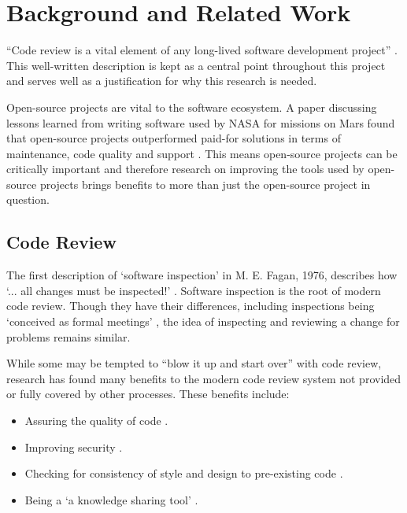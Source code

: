 \chapter{Background and Related Work}
\label{chap:background-and-related-work}

``Code review is a vital element of any long-lived software development project'' \citep[p. 1037]{10.1145/2884781.2884840}. This well-written description is kept as a central point throughout this project and serves well as a justification for why this research is needed.

Open-source projects are vital to the software ecosystem. A paper discussing lessons learned from writing software used by NASA for missions on Mars found that open-source projects outperformed paid-for solutions in terms of maintenance, code quality and support \citep[p. 44]{NorrisMissionCritical}. This means open-source projects can be critically important and therefore research on improving the tools used by open-source projects brings benefits to more than just the open-source project in question.


\section{Code Review}

The first description of `software inspection' in M. E. Fagan, 1976, describes how `... all changes must be inspected!' \citep[p. 280]{5387093}. Software inspection is the root of modern code review. Though they have their differences, including inspections being `conceived as formal meetings' \citep[p. 27]{7202946}, the idea of inspecting and reviewing a change for problems remains similar.

While some may be tempted to ``blow it up and start over'' with code review, research has found many benefits to the modern code review system not provided or fully covered by other processes. These benefits include:
\begin{itemize}
    \item Assuring the quality of code \citep[p. 2183]{McIntosh2015} \citep[p. 27]{7202946} \citep[p. 181]{10.1145/3183519.3183525}.
    \item Improving security \citep[p. 181]{10.1145/3183519.3183525}.
    \item Checking for consistency of style and design to pre-existing code \citep[p. 181]{10.1145/3183519.3183525}.
    \item Being a `a knowledge sharing tool' \citep[p. 27]{7202946}.
\end{itemize}

